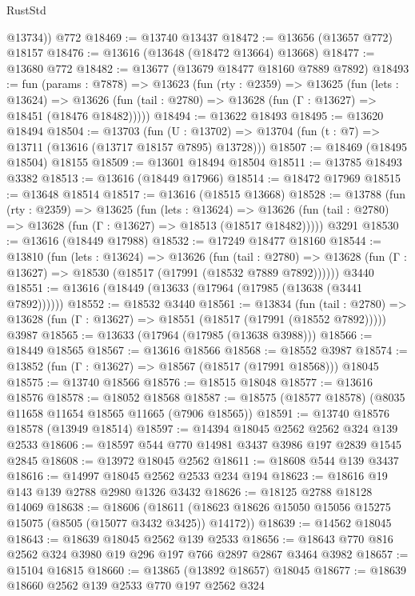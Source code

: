 \begin{lexlean}{RustStd}
\begin{coremodule}
        @13734))
    @772
@18469 := @13740 @13437
@18472 := @13656 (@13657 @772) @18157
@18476 := @13616 (@13648 (@18472 @13664) @13668)
@18477 := @13680 @772
@18482 := @13677 (@13679 @18477 @18160 @7889 @7892)
@18493 := fun (params : @7878) =>
  @13623
    (fun (rty : @2359) =>
    @13625
      (fun (lets : @13624) =>
      @13626 (fun (tail : @2780) => @13628 (fun (Γ : @13627) => @18451 (@18476 @18482)))))
@18494 := @13622 @18493
@18495 := @13620 @18494
@18504 := @13703
    (fun (U : @13702) => @13704 (fun (t : @7) => @13711 (@13616 (@13717 @18157 @7895) @13728)))
@18507 := @18469 (@18495 @18504) @18155
@18509 := @13601 @18494 @18504
@18511 := @13785 @18493 @3382
@18513 := @13616 (@18449 @17966)
@18514 := @18472 @17969
@18515 := @13648 @18514
@18517 := @13616 (@18515 @13668)
@18528 := @13788
    (fun (rty : @2359) =>
    @13625
      (fun (lets : @13624) =>
      @13626 (fun (tail : @2780) => @13628 (fun (Γ : @13627) => @18513 (@18517 @18482)))))
    @3291
@18530 := @13616 (@18449 @17988)
@18532 := @17249 @18477 @18160
@18544 := @13810
    (fun (lets : @13624) =>
    @13626
      (fun (tail : @2780) =>
      @13628 (fun (Γ : @13627) => @18530 (@18517 (@17991 (@18532 @7889 @7892))))))
    @3440
@18551 := @13616 (@18449 (@13633 (@17964 (@17985 (@13638 (@3441 @7892))))))
@18552 := @18532 @3440
@18561 := @13834
    (fun (tail : @2780) => @13628 (fun (Γ : @13627) => @18551 (@18517 (@17991 (@18552 @7892)))))
    @3987
@18565 := @13633 (@17964 (@17985 (@13638 @3988)))
@18566 := @18449 @18565
@18567 := @13616 @18566
@18568 := @18552 @3987
@18574 := @13852 (fun (Γ : @13627) => @18567 (@18517 (@17991 @18568))) @18045
@18575 := @13740 @18566
@18576 := @18515 @18048
@18577 := @13616 @18576
@18578 := @18052 @18568
@18587 := @18575 (@18577 @18578) (@8035 @11658 @11654 @18565 @11665 (@7906 @18565))
@18591 := @13740 @18576 @18578 (@13949 @18514)
@18597 := @14394 @18045 @2562 @2562 @324 @139 @2533
@18606 := @18597 @544 @770 @14981 @3437 @3986 @197 @2839 @1545 @2845
@18608 := @13972 @18045 @2562
@18611 := @18608 @544 @139 @3437
@18616 := @14997 @18045 @2562 @2533 @234 @194
@18623 := @18616 @19 @143 @139 @2788 @2980 @1326 @3432
@18626 := @18125 @2788 @18128 @14069
@18638 := @18606
    (@18611 (@18623 @18626 @15050 @15056 @15275 @15075 (@8505 (@15077 @3432 @3425)) @14172))
@18639 := @14562 @18045
@18643 := @18639 @18045 @2562 @139 @2533
@18656 := @18643 @770 @816 @2562 @324 @3980 @19 @296 @197 @766 @2897 @2867 @3464 @3982
@18657 := @15104 @16815
@18660 := @13865 (@13892 @18657) @18045
@18677 := @18639
    @18660
    @2562
    @139
    @2533
    @770
    @197
    @2562
    @324

\end{coremodule}
\end{lexlean}
